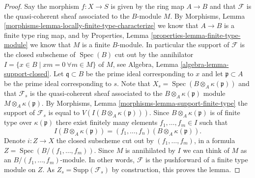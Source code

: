 \documentclass[10pt,a4paper]{amsart}
\theoremstyle{plain}
\theoremstyle{definition}
\theoremstyle{remark}
\numberwithin{equation}{subsection}
\def\Spec{\mathop{\mathrm{Spec}}}
\begin{document}
\begin{proof}
Say the morphism $f : X \to S$ is given by the ring map
$A \to B$ and that $\mathcal{F}$ is the quasi-coherent sheaf
associated to the $B$-module $M$. By
Morphisms, Lemma \ref{morphisms-lemma-locally-finite-type-characterize}
we know that $A \to B$ is a finite type ring map, and by
Properties, Lemma \ref{properties-lemma-finite-type-module}
we know that $M$ is a finite $B$-module. In particular the
support of $\mathcal{F}$ is the closed subscheme of $\Spec(B)$
cut out by the annihilator
$I = \{x \in B \mid xm = 0\ \forall m \in M\}$ of $M$, see
Algebra, Lemma \ref{algebra-lemma-support-closed}.
Let $\mathfrak q \subset B$ be the prime ideal corresponding to $x$
and let $\mathfrak p \subset A$ be the prime ideal corresponding to $s$.
Note that $X_s = \Spec(B \otimes_A \kappa(\mathfrak p))$ and
that $\mathcal{F}_s$ is the quasi-coherent sheaf associated to the
$B \otimes_A \kappa(\mathfrak p)$ module $M \otimes_A \kappa(\mathfrak p)$. By
Morphisms, Lemma \ref{morphisms-lemma-support-finite-type}
the support of $\mathcal{F}_s$ is equal to
$V(I(B \otimes_A \kappa(\mathfrak p)))$. Since
$B \otimes_A \kappa(\mathfrak p)$ is of finite type over $\kappa(\mathfrak p)$
there exist finitely many elements $f_1, \ldots, f_m \in I$
such that
$$
I(B \otimes_A \kappa(\mathfrak p)) =
(f_1, \ldots, f_n)(B \otimes_A \kappa(\mathfrak p)).
$$
Denote $i : Z \to X$ the closed subscheme cut out by
$(f_1, \ldots, f_m)$, in a formula $Z = \Spec(B/(f_1, \ldots, f_m))$.
Since $M$ is annihilated by $I$ we can think of $M$ as an
$B/(f_1, \ldots, f_m)$-module. In other words, $\mathcal{F}$ is the
pushforward of a finite type module on $Z$.
As $Z_s = \text{Supp}(\mathcal{F}_s)$ by construction, this
proves the lemma.
\end{proof}
\end{document}
